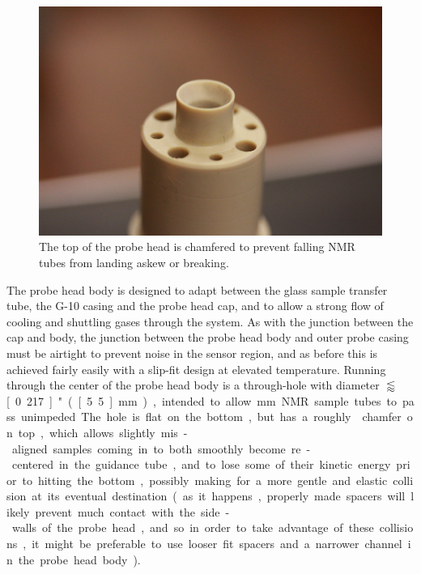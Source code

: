 \documentclass[PaulGanssle-Thesis.tex]{subfiles}
\begin{document}
\label{mag.design.probe.head.body}
\begin{figure}
\vspace*{-0.3\lineheight}
\includegraphics[width=0.33\tw]{figures/magnetometer/NewProbeHeadChamferSmaller.png}
\caption{The top of the probe head is chamfered to prevent falling NMR tubes from landing askew or breaking.}
\label{fig:ProbeHeadChamfer}
\vspace*{-0.5\lineheight}
\end{figure}
The probe head body is designed to adapt between the glass sample transfer tube, the G-10 casing and the probe head cap, and to allow a strong flow of cooling and shuttling gases through the system. As with the junction between the cap and body, the junction between the probe head body and outer probe casing must be airtight to prevent noise in the sensor region, and as before this is achieved fairly easily with a slip-fit design at elevated temperature. Running through the center of the probe head body is a through-hole with diameter $\lessapprox$ \unit[0.217]{"} (\unit[5.5]{mm}), intended to allow \unit[5]{mm} NMR sample tubes to pass unimpeded. The hole is flat on the bottom, but has a roughly \unit[30]{\degsym} chamfer on top, which allows slightly mis-aligned samples coming in to both smoothly become re-centered in the guidance tube, and to lose some of their kinetic energy prior to hitting the bottom, possibly making for a more gentle and elastic collision at its eventual destination (as it happens, properly made spacers will likely prevent much contact with the side-walls of the probe head, and so in order to take advantage of these collisions, it might be preferable to use looser fit spacers and a narrower channel in the probe head body).
\end{document}
